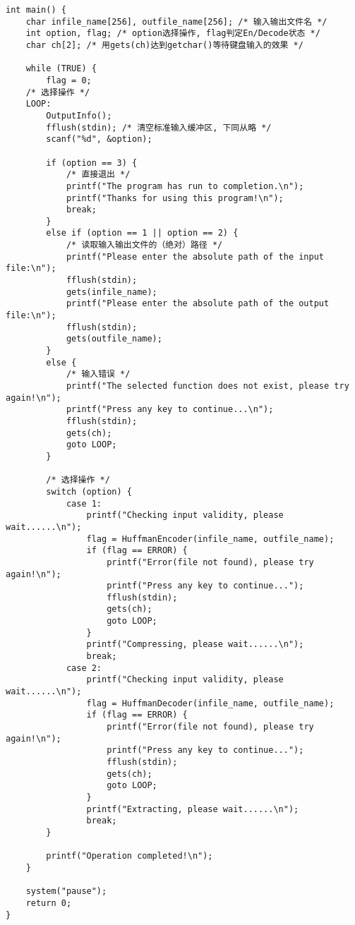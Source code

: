 \documentclass[a4paper]{ctexart}
\begin{document}
{\setmainfont{Courier New Bold}              
\begin{lstlisting}
int main() {
    char infile_name[256], outfile_name[256]; /* 输入输出文件名 */
    int option, flag; /* option选择操作, flag判定En/Decode状态 */
    char ch[2]; /* 用gets(ch)达到getchar()等待键盘输入的效果 */
    
    while (TRUE) {
        flag = 0;
    /* 选择操作 */
    LOOP:
        OutputInfo();
        fflush(stdin); /* 清空标准输入缓冲区, 下同从略 */
        scanf("%d", &option);

        if (option == 3) {
            /* 直接退出 */
            printf("The program has run to completion.\n");
            printf("Thanks for using this program!\n");
            break;
        }
        else if (option == 1 || option == 2) {
            /* 读取输入输出文件的（绝对）路径 */
            printf("Please enter the absolute path of the input file:\n");
            fflush(stdin);
            gets(infile_name);
            printf("Please enter the absolute path of the output file:\n");
            fflush(stdin);
            gets(outfile_name);
        }
        else {
            /* 输入错误 */
            printf("The selected function does not exist, please try again!\n");
            printf("Press any key to continue...\n");
            fflush(stdin);
            gets(ch);
            goto LOOP;
        }

        /* 选择操作 */
        switch (option) {
            case 1:
                printf("Checking input validity, please wait......\n");
                flag = HuffmanEncoder(infile_name, outfile_name);
                if (flag == ERROR) {
                    printf("Error(file not found), please try again!\n");
                    printf("Press any key to continue...");
                    fflush(stdin);
                    gets(ch);
                    goto LOOP;
                }
                printf("Compressing, please wait......\n");
                break;
            case 2:
                printf("Checking input validity, please wait......\n");
                flag = HuffmanDecoder(infile_name, outfile_name);
                if (flag == ERROR) {
                    printf("Error(file not found), please try again!\n");
                    printf("Press any key to continue...");
                    fflush(stdin);
                    gets(ch);
                    goto LOOP;
                }
                printf("Extracting, please wait......\n");
                break;
        }

        printf("Operation completed!\n");
    }

    system("pause");
    return 0;
}
\end{lstlisting}}
\end{document}
